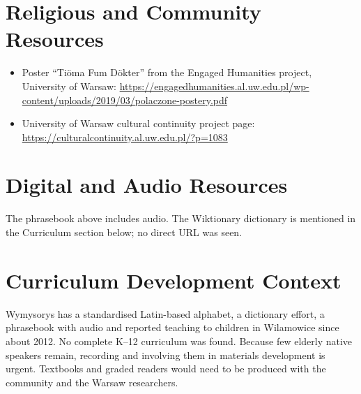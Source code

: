 \documentclass[12pt]{article}
\begin{document}
\section{Religious and Community Resources}
\begin{itemize}
\item Poster ``Ti\"oma Fum D\"okter'' from the Engaged Humanities project, University of Warsaw: \url{https://engagedhumanities.al.uw.edu.pl/wp-content/uploads/2019/03/polaczone-postery.pdf}
\item University of Warsaw cultural continuity project page: \url{https://culturalcontinuity.al.uw.edu.pl/?p=1083}
\end{itemize}

\section{Digital and Audio Resources}
The phrasebook above includes audio. The Wiktionary dictionary is mentioned in the Curriculum section below; no direct URL was seen.

\section{Curriculum Development Context}
Wymysorys has a standardised Latin-based alphabet, a dictionary effort, a phrasebook with audio and reported teaching to children in Wilamowice since about 2012. No complete K--12 curriculum was found. Because few elderly native speakers remain, recording and involving them in materials development is urgent. Textbooks and graded readers would need to be produced with the community and the Warsaw researchers.
\end{document}
